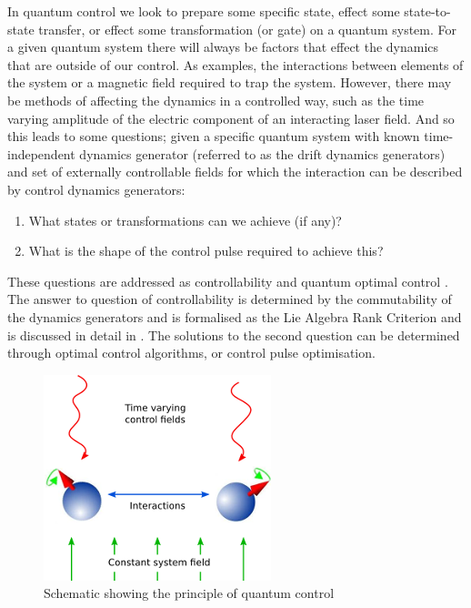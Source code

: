 \documentclass[12pt]{article}
\begin{document}
In quantum control we look to prepare some specific state, effect some state-to-state transfer, or effect some transformation (or gate) on a quantum system. 
For a given quantum system there will always be factors that effect the dynamics that are outside of our control. As examples, the interactions between elements of the system or a magnetic field required to trap the system. 
However, there may be methods of affecting the dynamics in a controlled way, such as the time varying amplitude of the electric component of an interacting laser field. 
And so this leads to some questions; given a specific quantum system with known time-independent dynamics generator (referred to as the drift dynamics generators) and set of externally controllable fields for which the interaction can be described by control dynamics generators:
\begin{enumerate}
    \item What states or transformations can we achieve (if any)?
    \item What is the shape of the control pulse required to achieve this?
\end{enumerate}
These questions are addressed as controllability and quantum optimal control \cite{d2021introduction}. The answer to question of controllability is determined by the commutability of the dynamics generators and is formalised as the Lie Algebra Rank Criterion and is discussed in detail in \cite{d2021introduction}. 
The solutions to the second question can be determined through optimal control algorithms, or control pulse optimisation.

\begin{figure}[H]
    \centering
    \includegraphics[width=0.5\linewidth]{principles_quantum_control.png}
    \caption{Schematic showing the principle of quantum control}
    \label{fig:principles_quantum_control}
\end{figure}
\end{document}
